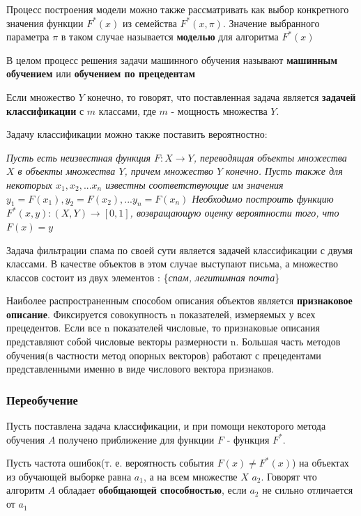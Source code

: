 Процесс построения модели можно также рассматривать как выбор конкретного значения функции $F^*(x)$ из семейства $F^*(x, \pi)$. Значение выбранного параметра $\pi$ в таком случае называется \textbf{моделью} для алгоритма
$F^*(x)$

В целом процесс решения задачи машинного обучения называют \textbf{машинным обучением} или \textbf{обучением по прецедентам}

Если множество $Y$ конечно, то говорят, что поставленная задача  является \textbf{задачей классификации} с $m$ классами, где $m$ - мощность множества $Y$.

Задачу классификации можно также поставить вероятностно:

\textit {
Пусть есть неизвестная функция $F: X \rightarrow Y$, переводящая объекты
множества $X$ в объекты множества $Y$, причем множество $Y$ конечно. Пусть также для некоторых $x_1, x_2, ... x_n$ известны соответствующие им значения $y_1 = F(x_1), y_2 = F(x_2), ... y_n = F(x_n)$ Необходимо построить функцию $F^*(x, y): (X, Y) \rightarrow [0, 1]$, возвращающую оценку вероятности того, что $F(x)=y$
}

Задача фильтрации спама по своей сути является задачей классификации с двумя классами. В качестве объектов в этом случае выступают письма, а множество классов состоит из двух элементов : \{\textit{спам, легитимная почта}\}

Наиболее распространенным способом описания объектов является \textbf{признаковое описание}. Фиксируется совокупность n показателей, измеряемых у всех прецедентов. Если все n показателей числовые, то признаковые описания представляют собой числовые векторы размерности n. Большая часть методов обучения(в частности метод опорных векторов) работают с прецедентами представленными именно в виде числового вектора признаков.


\subsubsection{Переобучение}
\label{overfitting}
Пусть поставлена задача классификации, и при помощи некоторого метода обучения $A$ получено приближение для функции $F$ - функция $F^*$. 

Пусть частота ошибок(т. е. вероятность события $F(x) \neq F^*(x)$) на объектах из обучающей выборке равна $a_1$, а на всем множестве $X$ $a_2$. Говорят что алгоритм $A$ обладает \textbf{обобщающей способностью}, если $a_2$ не сильно отличается от $a_1$

